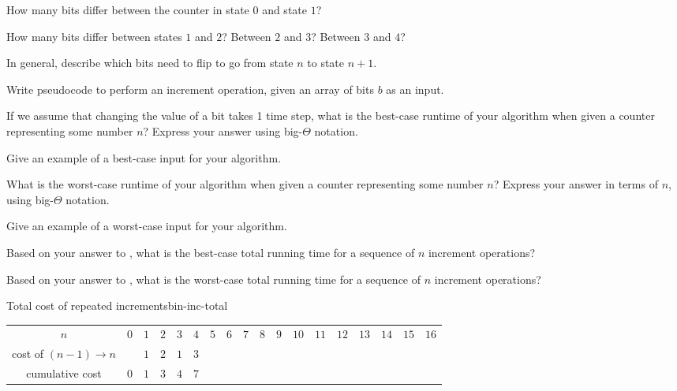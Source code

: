 \documentclass{tufte-handout}
\begin{document}
\begin{questions}
  \item How many bits differ between the counter in state $0$ and
    state $1$?
  \item How many bits differ between states $1$ and $2$?  Between $2$
    and $3$?  Between $3$ and $4$?
  \item In general, describe which bits need to flip to go from state
    $n$ to state $n+1$.
  \item Write pseudocode to perform an increment operation, given an
    array of bits $b$ as an input.
  \item \label{q:inc-best} If we assume that changing the value of a
    bit takes 1 time step, what is the best-case runtime of your
    algorithm when given a counter representing some number $n$?
    Express your answer using big-$\Theta$ notation.
  \item Give an example of a best-case input for your algorithm.
  \item \label{q:inc-worst} What is the worst-case runtime of your
    algorithm when given a counter representing some number $n$?
    Express your answer in terms of $n$, using big-$\Theta$
    notation.
  \item Give an example of a worst-case input for your algorithm.
  \item Based on your answer to , what is the
    best-case total running time for a sequence of $n$ increment
    operations?
  \item \label{q:worst-total} Based on your answer to
    , what is the worst-case total running time for
    a sequence of $n$ increment operations?
  \end{questions}

\pause

\begin{model*}{Total cost of repeated increments}{bin-inc-total}
  \centering
  \begin{tabular}{c|ccccccccccccccccc}
    $n$ & $0$ & $1$ & $2$ & $3$ & $4$ & $5$ & $6$ & $7$ & $8$ & $9$ & $10$
    & $11$ & $12$ & $13$ & $14$ & $15$ & $16$ \\[8pt]
    cost of $(n-1) \to n$ &  & $1$ & $2$ & $1$ & $3$ & &  &  &  &  &
    &  &  &  &  &  &  \\[8pt]
    cumulative cost & $0$ & $1$ & $3$ & $4$ & $7$ &  &  &  &
    &  &  &  &  &  &  &  &
  \end{tabular}
\end{model*}
\end{document}
